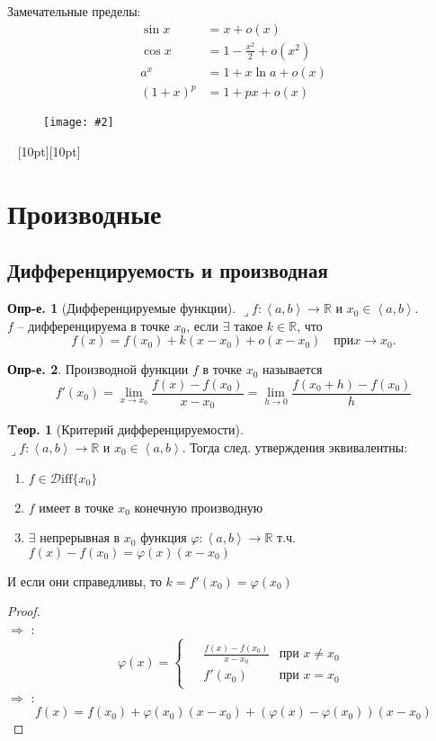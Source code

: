\documentclass[a4paper,12pt]{article}
\numberwithin{figure}{section}
\newcommand\cfigure[2]{
	\begin{figure}[H] \centering \texttt{[image: \#2]} \end{figure}
}
\theoremstyle{definition}
\newtheorem{definition}{Опр-е.}[section]
\newtheorem{theorem}{Tеор.}[section]
\def\R{\mathbb{R}}
\def\Diff{\!\in\!\mathcal{D}\mathrm{iff}}
\def\on{\!:}
\def\intab{\left<a,b\right>}
\def\circleone{\ding{192}\space}
\def\circletwo{\ding{193}\space}
\def\circlethree{\ding{194}\space}
\def\lets{{\huge$\lrcorner$}\space}
\def\vignette{\vspace{48pt} \noindent \hrulefill~ \raisebox{-8pt}[10pt][10pt]{\Huge\ding{102}}~ \hrulefill}
\begin{document}
Замечательные пределы:
\begin{align*}
	   \sin x &= x + o(x)
	\\ \cos x &= 1 - \frac{x^2}2 + o(x^2)
	\\ a^x &= 1 + x \ln a + o(x)
	\\ (1+x)^p &= 1 + px + o(x)
\end{align*}

\cfigure{\linewidth}{small-o-test-1.png}


\vignette
\section{Производные}


\subsection{Дифференцируемость и производная}


\begin{definition}[Дифференцируемые функции]
	\lets $f\on\intab\to\R$ и $x_0\in\intab$. \\
	$f$ -- дифференцируема в точке $x_0$, если $\exists$ такое $k\in\R$, что
	\[ f(x) = f(x_0) + k(x-x_0) + o(x-x_0) \quad при x \to x_0. \]
\end{definition}


\begin{definition}
	Производной функции $f$ в точке $x_0$ называется
	\[ f'(x_0) = \lim_{x\to x_0}\frac{f(x)-f(x_0)}{x-x_0}
			   = \lim_{h\to 0}\frac{f(x_0+h)-f(x_0)}h \]
\end{definition}


\begin{theorem}[Критерий дифференцируемости] ~\\
	\lets $f\on \intab\to\R$ и $x_0\in\intab$.
	Тогда след. утверждения эквивалентны:
	\begin{enumerate}
		\item $f\Diff\{x_0\}$
		\item $f$ имеет в точке $x_0$ конечную производную
		\item $\exists$ непрерывная в $x_0$ функция $\varphi\on\intab\to\R$
			  т.ч. $f(x)-f(x_0) = \varphi(x)(x-x_0)$
	\end{enumerate}
	И если они справедливы, то $k=f'(x_0)=\varphi(x_0)$
\end{theorem}
\begin{proof}
	~\\
	\circletwo $\Rightarrow$ \circlethree: \[
		\varphi(x) = \begin{cases}\begin{aligned}
			& \frac{f(x)-f(x_0)}{x-x_0}  & \text{при } x \ne x_0 \\
			& f'(x_0)                    & \text{при } x=x_0
		\end{aligned}
		\end{cases}
	\]
	\circlethree $\Rightarrow$ \circleone: \[
		f(x) = f(x_0) + \varphi(x_0)(x-x_0) + \left( \varphi(x)-\varphi(x_0) \right) (x-x_0)
	\]
\end{proof}
\end{document}
